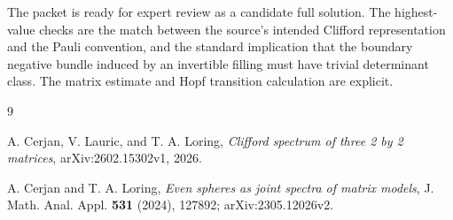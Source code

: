 \documentclass[11pt]{article}
\newcommand{\1}{I}
\begin{document}
The packet is ready for expert review as a candidate full solution.  The
highest-value checks are the match between the source's intended Clifford
representation and the Pauli convention, and the standard implication that
the boundary negative bundle induced by an invertible filling must have
trivial determinant class.  The matrix estimate and Hopf transition
calculation are explicit.

\begin{thebibliography}{9}

A. Cerjan, V. Lauric, and T. A. Loring,
\emph{Clifford spectrum of three 2 by 2 matrices},
arXiv:2602.15302v1, 2026.

A. Cerjan and T. A. Loring,
\emph{Even spheres as joint spectra of matrix models},
J. Math. Anal. Appl. \textbf{531} (2024), 127892;
arXiv:2305.12026v2.

\end{thebibliography}
\end{document}

